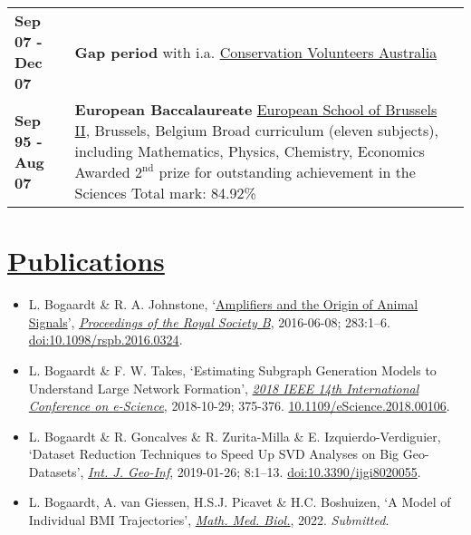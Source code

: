 \documentclass[a4paper,8pt]{extarticle}
\begin{document}
\begin{center}
\begin{tabular}{p{}p{}}
\textbf{Sep 07 - Dec 07}&\textbf{Gap period} with i.a. \href{http://conservationvolunteers.com.au}{Conservation Volunteers Australia}
\vspace{2mm}\\
\textbf{Sep 95 - Aug 07}&\textbf{European Baccalaureate}\newline
\href{http://www.eeb2.be/site/}{European School of Brussels II}, Brussels, Belgium\newline
Broad curriculum (eleven subjects), including Mathematics, Physics, Chemistry, Economics\newline
Awarded $2^\text{nd}$ prize for outstanding achievement in the Sciences\newline
Total mark: 84.92\%
\end{tabular}
\end{center}

\vspace{-1mm}

\section*{\href{http://www.lbogaardt.eu}{Publications}}

\enlargethispage{20mm}

\begin{itemize}[leftmargin=*]
\setlength{\itemsep}{-0.7mm}
\item L. Bogaardt \& R. A. Johnstone, `\href{http://www.lbogaardt.eu/?s=m2p}{Amplifiers and the Origin of Animal Signals}', \textit{\href{http://rspb.royalsocietypublishing.org/content/283/1832/20160324}{Proceedings of the Royal Society B}}, 2016-06-08; 283:1--6. \href{http://doi.org/10.1098/rspb.2016.0324}{doi:10.1098/rspb.2016.0324}.
\item L. Bogaardt \& F. W. Takes, `Estimating Subgraph Generation Models to Understand Large Network Formation', \textit{\href{https://ieeexplore.ieee.org/abstract/document/8588725}{2018 IEEE 14th International Conference on e-Science}}, 2018-10-29; 375-376. \href{http://doi.org/10.1109/eScience.2018.00106}{10.1109/eScience.2018.00106}.
\item L. Bogaardt \& R. Goncalves \& R. Zurita-Milla \& E. Izquierdo-Verdiguier, `Dataset Reduction Techniques to Speed Up SVD Analyses on Big Geo-Datasets', \textit{\href{https://www.mdpi.com/2220-9964/8/2/55}{Int. J. Geo-Inf}}, 2019-01-26; 8:1--13. \href{http://doi.org/10.3390/ijgi8020055}{doi:10.3390/ijgi8020055}.
\item L. Bogaardt, A. van Giessen, H.S.J. Picavet \& H.C. Boshuizen, `A Model of Individual BMI Trajectories', \textit{\href{https://academic.oup.com/imammb}{Math. Med. Biol.}}, 2022. \textit{Submitted}.
\end{itemize}
\end{document}
